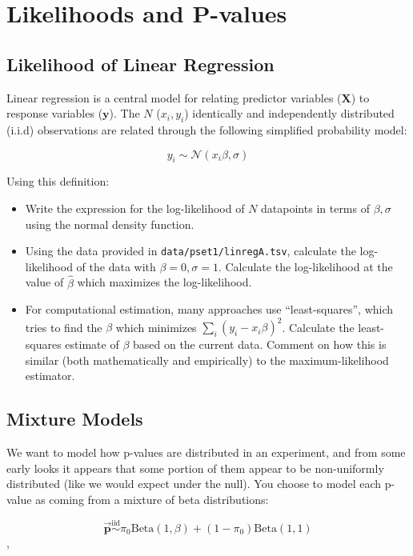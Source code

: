 \documentclass{pset}
\begin{document}
\section*{Likelihoods and P-values}

\subsection*{Likelihood of Linear Regression}

Linear regression is a central model for relating predictor variables ($\mathbf{X}$) to response variables ($\mathbf{y}$). The $N$ ($x_i, y_i$) identically and independently distributed (i.i.d) observations are related through the following simplified probability model: 

$$y_i \sim \mathcal{N}(x_i\beta, \sigma)$$ 

Using this definition:

\begin{itemize}
\item Write the expression for the log-likelihood of $N$ datapoints in terms of $\beta, \sigma$ using the normal density function.
\item Using the data provided in \texttt{data/pset1/linregA.tsv}, calculate the log-likelihood of the data with $\beta = 0,\sigma=1$. Calculate the log-likelihood at the value of $\hat{\beta}$ which maximizes the log-likelihood. 
\item For computational estimation, many approaches use ``least-squares'', which tries to find the $\beta$ which minimizes $\sum_i (y_i - x_i\beta)^2$. Calculate the least-squares estimate of $\beta$ based on the current data. Comment on how this is similar (both mathematically and empirically) to the maximum-likelihood estimator.
\end{itemize}

\subsection*{Mixture Models}

We want to model how p-values are distributed in an experiment, and from some early looks it appears that some portion of them appear to be non-uniformly distributed (like we would expect under the null). You choose to model each p-value as coming from a mixture of beta distributions:

$$\overrightarrow{\mathbf{p}} \overset{\text{iid}}{\sim} \pi_0 \text{Beta}(1, \beta) + (1 - \pi_0)\text{Beta}(1,1)$$, 
\end{document}
